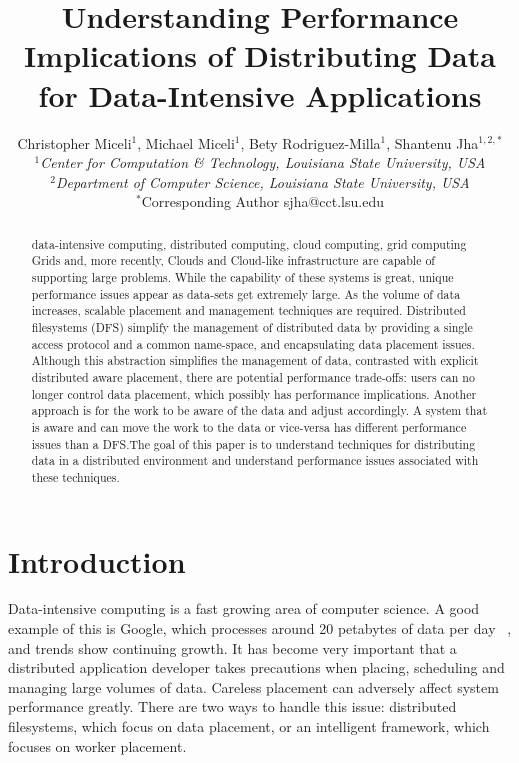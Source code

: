 \documentclass{rspublic}
\title[Understanding Performance Implications of Distributing Data for
Data-Intensive Applications]{Understanding Performance Implications of
Distributing Data for Data-Intensive Applications}
\author[Miceli, Miceli, Rodriguez-Milla, Jha]{ Christopher Miceli$^{1}$,
Michael Miceli$^{1}$, Bety Rodriguez-Milla$^{1}$, Shantenu Jha$^{1,2,*}$
\\ \small{\emph{$^{1}$Center for Computation \& Technology, Louisiana
State University, USA}} \\  \small{\emph{$^{2}$Department of Computer
Science, Louisiana State University, USA}} \\ {\footnotesize
{\hspace{0.0 in} $^*$Corresponding Author sjha@cct.lsu.edu}} }
\begin{document}
 \maketitle


\begin{abstract}{data-intensive computing, distributed computing, cloud
computing, grid computing} Grids and, more recently, Clouds and
Cloud-like infrastructure are capable of supporting large problems.
While the capability of these systems is great, unique performance
issues appear as data-sets get extremely large.  As the volume of data
increases, scalable placement and management techniques are required.
Distributed filesystems (DFS) simplify the management of distributed
data by providing a single access protocol and a common name-space, and
encapsulating data placement issues.  Although this abstraction
simplifies the management of data, contrasted with explicit distributed
aware placement, there are potential performance trade-offs: users can
no longer control data placement, which possibly has performance
implications.  Another approach is for the work to be aware of the data
and adjust accordingly.  A system that is aware and can move the work to
the data or vice-versa has different performance issues than a DFS.The
goal of this paper is to understand techniques for distributing data in
a distributed environment and understand performance issues associated
with these techniques.  \end{abstract}

\section{Introduction} Data-intensive computing is a fast growing area
of computer science.  A good example of this is Google, which processes
around 20 petabytes of data per day ~\citep{google}, and trends show
continuing growth.  It has become very important that a distributed
application developer takes precautions when placing, scheduling and
managing large volumes of data.  Careless placement can adversely affect
system performance greatly.  There are two ways to handle this issue:
distributed filesystems, which focus on data placement, or an
intelligent framework, which focuses on worker placement.
\end{document}
